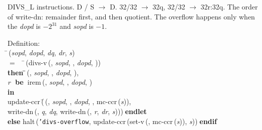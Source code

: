  DIVS\_L instructions.  D / S $\rightarrow$ D.
 32/32 $\rightarrow$ 32q,  32/32 $\rightarrow$ 32r:32q.  The order of 
 write-dn:  remainder first, and then quotient.  The overflow happens 
 only when the {\it{dopd\/}} is $-2^{31}$ and {\it{sopd\/}} is $-1$.
\begin{tabbing}{\sc Definition}: \\  
\=\,({\it{sopd\/}}, {\it{dopd\/}}, {\it{dq\/}}, {\it{dr\/}}, {\it{s\/}}) \\ 
$=$$\;\;\;\;$\=\,({\rm{divs-v}}\,({}, {\it{sopd\/}}, {}, {\it{dopd\/}}, {})) \\ 
{\bf then }\=\=\,({}, {\it{sopd\/}}, {}, {\it{dopd\/}}, {}), \\ 
{\it{r\/}}{\bf $\;$ be$\;\;$}{\rm{irem}}\,({}, {\it{sopd\/}}, {}, {\it{dopd\/}}, {})\- \\ 
{\bf in} \\ 
{\rm{update-ccr}}\,(\=\,({}, {\it{sopd\/}}, {}, {\it{dopd\/}}, {}, {\rm{mc-ccr}}\,({\it{s\/}})), \\ 
{\rm{write-dn}}\,({}, {\it{q\/}}, {\it{dq\/}}, {\rm{write-dn}}\,({}, {\it{r\/}}, {\it{dr\/}}, {\it{s\/}})))\-$\;${\bf  endlet}\- \\ 
{\bf else }{\rm{halt}}\,({\tt{'}}{\tt{divs-overflow}}, {\rm{update-ccr}}\,({\rm{set-v}}\,({}, {\rm{mc-ccr}}\,({\it{s\/}})), {\it{s\/}}))$\;${\bf  endif}\-\-
\end{tabbing}

